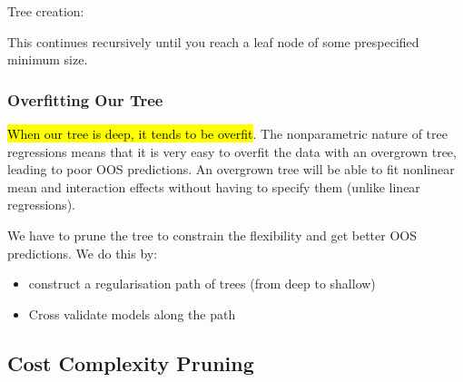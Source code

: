 \documentclass[11pt]{article}
\begin{document}
    
\begin{algo}

Tree creation:

\begin{center}

\end{center}
    
\end{algo}


This continues recursively until you reach a leaf node of some prespecified minimum size.

\subsubsection{Overfitting Our Tree}

\hl{When our tree is deep, it tends to be overfit}. The nonparametric nature of tree regressions means that it is very easy to overfit the data with an overgrown tree, leading to poor OOS predictions. An overgrown tree will be able to fit nonlinear mean and interaction effects without having to specify them (unlike linear regressions).

We have to prune the tree to constrain the flexibility and get better OOS predictions. We do this by:
\begin{itemize}
    \item construct a regularisation path of trees (from deep to shallow)
    \item Cross validate models along the path
\end{itemize}

\subsection{Cost Complexity Pruning}
\end{document}
